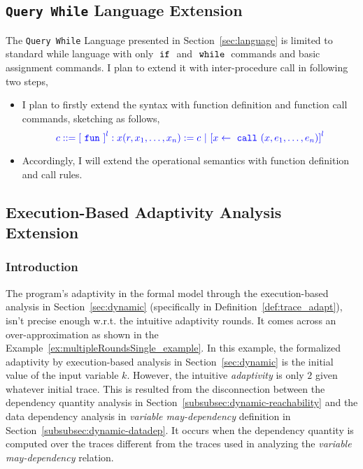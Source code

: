 \subsection{{\tt Query While} Language Extension}
\label{subsec:furthers-language}
The {\tt Query While} Language presented in Section~\ref*{sec:language} is limited to 
standard while language with only $\;\mathtt{if}\;$ and $\;\mathtt{while}\;$ commands and basic assignment commands.
I plan to extend it with inter-procedure call in following two steps,
\begin{itemize}
    \item I plan to firstly extend the syntax with  function definition and function call commands, sketching as follows,
\[
\highlight
{
c ::= 
\clabel{\efun}^l: x(r, x_1, \ldots, x_n) := c
~|~ \clabel{\assign{x}{\ecall(x, e_1, \ldots, e_n)}}^l
}
\]
    \item Accordingly, I will extend the operational semantics with function definition and call rules.
\end{itemize}

\subsection{Execution-Based Adaptivity Analysis Extension}
\label{subsec:furthers-dep-depth}
%
\subsubsection{Introduction}
\label{sec:furthers-exe-intro}
The program's adaptivity in the formal model through the execution-based analysis in Section~\ref{sec:dynamic}
(specifically in Definition~\ref{def:trace_adapt}), isn't precise enough w.r.t. the intuitive adaptivity rounds.
It comes across an over-approximation 
as shown in the Example~\ref{ex:multipleRoundsSingle_example}.
In this example, the formalized adaptivity by execution-based analysis in Section~\ref{sec:dynamic} 
is the initial value of the input variable $k$.
However, the intuitive \emph{adaptivity} is only $2$ given whatever initial trace.
This is resulted from the
disconnection between the 
dependency quantity analysis in Section~\ref{subsubsec:dynamic-reachability} and 
the data dependency analysis in \emph{variable may-dependency} definition in Section~\ref{subsubsec:dynamic-datadep}.
It occurs when the 
dependency quantity is computed over the traces different from the traces used in 
analyzing the \emph{variable may-dependency} relation.

